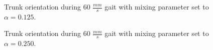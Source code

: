 				\begin{figure}
					\centering
					\caption{Trunk orientation during 60 $\frac{mm}{s}$ gait with mixing parameter set to $\alpha = 0.125$.}
					\label{fig::narx60_a125_nne}
				\end{figure}
				\begin{figure}
					\centering
					\caption{Trunk orientation during 60 $\frac{mm}{s}$ gait with mixing parameter set to $\alpha = 0.250$.}
					\label{fig::narx60_a250_nne}
				\end{figure}
